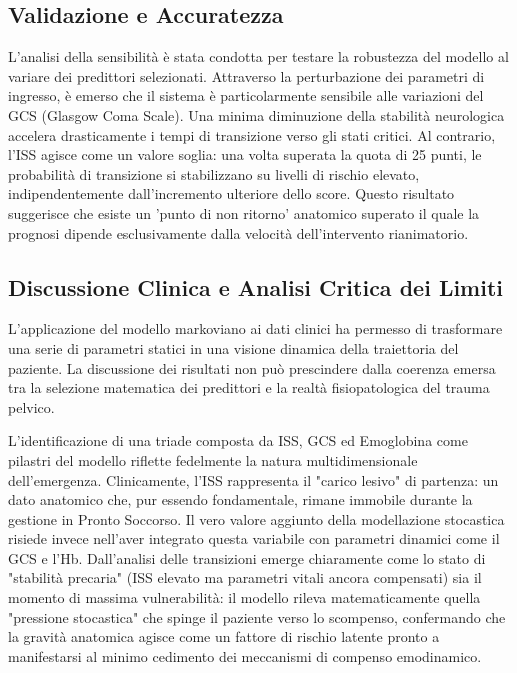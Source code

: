 \documentclass[11pt, oneside, noexaminfo]{sapthesis}   	%
\begin{document}
\subsection{Validazione e Accuratezza}
L'analisi della sensibilità è stata condotta per testare la robustezza del modello al variare dei predittori selezionati.
Attraverso la perturbazione dei parametri di ingresso, è emerso che il sistema è particolarmente sensibile alle variazioni del GCS (Glasgow Coma Scale). Una minima diminuzione della stabilità neurologica accelera drasticamente i tempi di transizione verso gli stati critici. Al contrario, l'ISS agisce come un valore soglia: una volta superata la quota di 25 punti, le probabilità di transizione si stabilizzano su livelli di rischio elevato, indipendentemente dall'incremento ulteriore dello score. Questo risultato suggerisce che esiste un 'punto di non ritorno' anatomico superato il quale la prognosi dipende esclusivamente dalla velocità dell'intervento rianimatorio.

\subsection{Discussione Clinica e Analisi Critica dei Limiti}
L'applicazione del modello markoviano ai dati clinici ha permesso di trasformare una serie di parametri statici in una visione dinamica della traiettoria del paziente. La discussione dei risultati non può prescindere dalla coerenza emersa tra la selezione matematica dei predittori e la realtà fisiopatologica del trauma pelvico.

L'identificazione di una triade composta da ISS, GCS ed Emoglobina come pilastri del modello riflette fedelmente la natura multidimensionale dell'emergenza. Clinicamente, l'ISS rappresenta il "carico lesivo" di partenza: un dato anatomico che, pur essendo fondamentale, rimane immobile durante la gestione in Pronto Soccorso. Il vero valore aggiunto della modellazione stocastica risiede invece nell'aver integrato questa variabile con parametri dinamici come il GCS e l'Hb. Dall'analisi delle transizioni emerge chiaramente come lo stato di "stabilità precaria" (ISS elevato ma parametri vitali ancora compensati) sia il momento di massima vulnerabilità: il modello rileva matematicamente quella "pressione stocastica" che spinge il paziente verso lo scompenso, confermando che la gravità anatomica agisce come un fattore di rischio latente pronto a manifestarsi al minimo cedimento dei meccanismi di compenso emodinamico.\\
\end{document}

